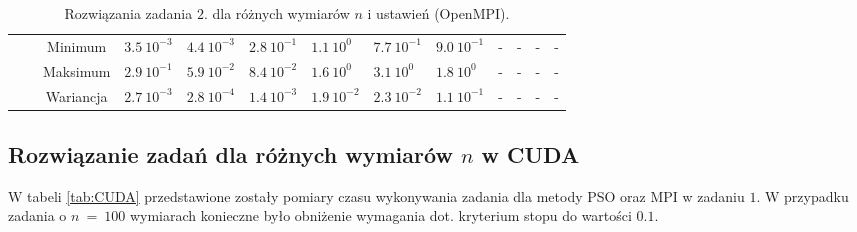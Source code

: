 \documentclass[11pt, a4paper, oneside]{article}
\begin{document}
\begin{table}[t]
\begin{adjustwidth}{-1.76cm}{}
\begin{tabular}{|c|c|c|l|l|l|l|l|l|c|c|c|c|}
                      &                               & Minimum   & $3.5 \ 10^{-3}$          & $4.4 \ 10^{-3}$         & $2.8 \ 10^{-1}$          & $1.1 \ 10^{0}$          & $7.7 \ 10^{-1}$          & $9.0 \ 10^{-1}$         & -           & -         & -           & -          \\ \cline{3-13} 
                      &                               & Maksimum  & $2.9 \ 10^{-1}$          & $5.9 \ 10^{-2}$         & $8.4 \ 10^{-2}$          & $1.6 \ 10^{0}$          & $3.1 \ 10^{0}$           & $1.8 \ 10^{0}$          & -           & -         & -           & -          \\ \cline{3-13} 
                      &                               & Wariancja & $2.7 \ 10^{-3}$          & $2.8 \ 10^{-4}$         & $1.4 \ 10^{-3}$          & $1.9 \ 10^{-2}$         & $2.3 \ 10^{-2}$          & $1.1 \ 10^{-1}$         & -           & -         & -           & -          \\ \hline
\end{tabular}
\end{adjustwidth}
\caption{Rozwiązania zadania $2$. dla różnych wymiarów $n$ i ustawień (OpenMPI).}
\label{tab:MPI:zad_2}
\end{table}

\subsection{Rozwiązanie zadań dla różnych wymiarów $n$ w CUDA} \label{sec:table:cuda}
W tabeli \ref{tab:CUDA} przedstawione zostały pomiary czasu wykonywania zadania dla metody PSO oraz MPI w zadaniu $1$. W przypadku zadania o $n \ = \ 100$ wymiarach konieczne było obniżenie wymagania dot. kryterium stopu do wartości $0.1$.
\end{document}
